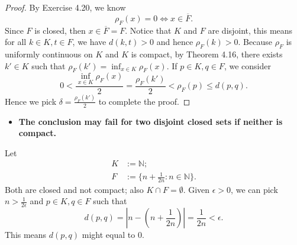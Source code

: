 \begin{Exercise}
	\begin{proof}
		By Exercise 4.20, we know
		$$
		\rho_F(x) = 0 \iff x\in \overline{F}.
		$$
		Since $F$ is closed, then $x\in \overline{F} = F$. Notice that $K$ and $F$ are disjoint, this means for all $k\in K, t\in F$, we have $d(k,t) > 0$ and hence $\rho_F(k) > 0$. Because $\rho_F$ is uniformly continuous on $K$ and $K$ is compact, by Theorem 4.16, there exists $k'\in K$ such that $\rho_F(k') = \inf_{x\in K} \rho_F(x)$.
		If $p\in K, q\in F$, we consider
		$$
		0 < \frac{\inf_{x\in K} \rho_F(x)}{2}
		= \frac{\rho_F(k')}{2} 
		< \rho_F(p)
		\leq d(p,q).
		$$
		Hence we pick $\delta = \frac{\rho_F(k')}{2}$ to complete the proof.
	\end{proof}
	
	\begin{itemize}
		\item \textbf{The conclusion may fail for two disjoint closed sets if neither is compact.}
	\end{itemize}
	\begin{solution}
		Let
		\begin{align*}
		K &:= \mathbb{N};\\
		F &:= \{n+\frac{1}{2n}:n\in\mathbb{N} \}.
		\end{align*}
		Both are closed and not compact; also $K\cap F = \emptyset$. Given $\epsilon>0$, we can pick $n>\frac{1}{2\epsilon}$ and $p\in K,q\in F$ such that
		$$
		d(p,q) = \left| n-\left(n+\frac{1}{2n}\right) \right|
		= \frac{1}{2n}
		< \epsilon.
		$$
		This means $d(p,q)$ might equal to $0$.
	\end{solution}
\end{Exercise}